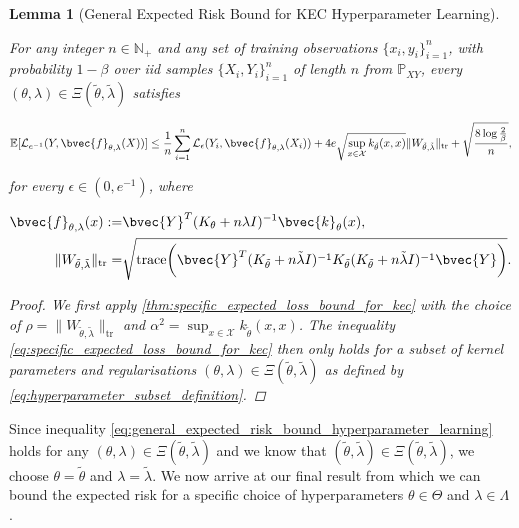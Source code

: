\documentclass{article}
\newtheorem{lemma}[theorem]{Lemma}
\begin{document}
		\begin{lemma}[General Expected Risk Bound for KEC Hyperparameter Learning]
			\label{thm:general_expected_risk_bound_hyperparameter_learning}
			
			For any integer $n \in \mathbb{N}_{+}$ and any set of training observations $\{x_{i}, y_{i}\}_{i = 1}^{n}$, with probability $1 - \beta$ over \textit{iid} samples $\{X_{i}, Y_{i}\}_{i = 1}^{n}$ of length $n$ from $\mathbb{P}_{X Y}$, every $(\theta, \lambda) \in \Xi(\tilde{\theta}, \tilde{\lambda})$ satisfies
			
			\begin{equation}
				\mathbb{E}[\mathcal{L}_{e^{-1}}(Y, \bvec{f}_{\theta, \lambda}(X))] \leq \frac{1}{n} \sum_{i = 1}^{n} \mathcal{L}_{\epsilon}(Y_{i}, \bvec{f}_{\theta, \lambda}(X_{i})) + 4 e \sqrt{\sup_{x \in \mathcal{X}} k_{\tilde{\theta}}(x, x)} \| W_{\tilde{\theta}, \tilde{\lambda}} \|_{\mathrm{tr}} + \sqrt{\frac{8 \log{\frac{2}{\beta}}}{n}},
			\label{eq:general_expected_risk_bound_hyperparameter_learning}
			\end{equation}
			
			for every $\epsilon \in (0, e^{-1})$, where 
			
			\begin{equation}
				\begin{aligned}
					\bvec{f}_{\theta, \lambda}(x) :=& \bvec{Y}^{T} (K_{\theta} + n \lambda I)^{-1} \bvec{k}_{\theta}(x), \\
					\| W_{\tilde{\theta}, \tilde{\lambda}} \|_{\mathrm{tr}} =& \sqrt{\mathrm{trace}\bigg(\bvec{Y}^{T} (K_{\tilde{\theta}} + n \tilde{\lambda} I)^{-1} K_{\tilde{\theta}} (K_{\tilde{\theta}} + n \tilde{\lambda} I)^{-1} \bvec{Y}\bigg)}.
				\end{aligned}
			\end{equation}
			
			\begin{proof}
				We first apply \cref{thm:specific_expected_loss_bound_for_kec} with the choice of $\rho = \| W_{\tilde{\theta}, \tilde{\lambda}} \|_{\mathrm{tr}}$ and $\alpha^{2} = \sup_{x \in \mathcal{X}} k_{\tilde{\theta}}(x, x)$. The inequality \eqref{eq:specific_expected_loss_bound_for_kec} then only holds for a subset of kernel parameters and regularisations $(\theta, \lambda) \in \Xi(\tilde{\theta}, \tilde{\lambda})$ as defined by \eqref{eq:hyperparameter_subset_definition}.
			\end{proof}
		\end{lemma}
		
		Since inequality \eqref{eq:general_expected_risk_bound_hyperparameter_learning} holds for any $(\theta, \lambda) \in \Xi(\tilde{\theta}, \tilde{\lambda})$ and we know that $(\tilde{\theta}, \tilde{\lambda}) \in \Xi(\tilde{\theta}, \tilde{\lambda})$, we choose $\theta = \tilde{\theta}$ and $\lambda = \tilde{\lambda}$.  We now arrive at our final result from which we can bound the expected risk for a specific choice of hyperparameters $\theta \in \Theta$ and $\lambda \in \Lambda$.
		
\end{document}
